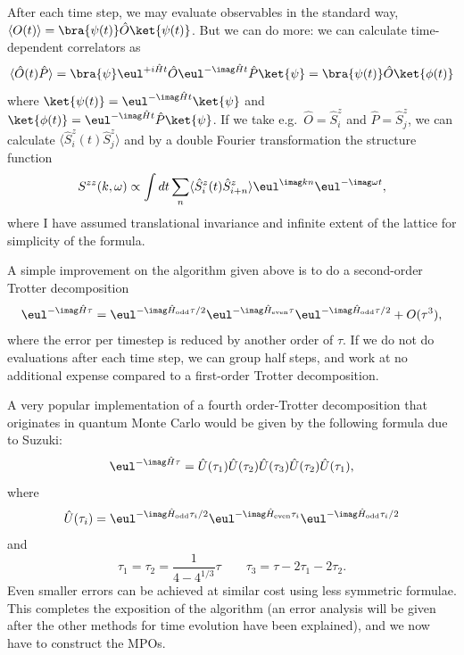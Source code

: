 After each time step, we may evaluate observables in the standard way, $\langle O(t) \rangle = \bra{\psi(t)} \hat{O} \ket{\psi(t)}$. But we can do more: we can calculate time-dependent correlators as
\begin{equation}
\langle \hat{O}(t) \hat{P} \rangle = \bra{\psi} \eul^{+i\hat{H}t} \hat{O} \eul^{-\imag \hat{H}t} \hat{P} \ket{\psi}
= \bra{\psi(t)} \hat{O} \ket{\phi(t)}
\end{equation}
where $\ket{\psi(t)} = \eul^{-\imag \hat{H}t}\ket{\psi}$ and $\ket{\phi(t)} = \eul^{-\imag \hat{H}t} \hat{P} \ket{\psi}$. If we take e.g.\ $\hat{O} = \hat{S}^z_i$ and $\hat{P} = \hat{S}^z_j$, we can calculate 
$\langle \hat{S}^z_i(t) \hat{S}^z_j \rangle$ and by a double Fourier transformation the structure function
\begin{equation}
S^{zz}(k,\omega) \propto \int dt \sum_{n} \langle \hat{S}^z_i(t) \hat{S}^z_{i+n} \rangle \eul^{\imag kn}\eul^{-\imag \omega t},
\end{equation}
where I have assumed translational invariance and infinite extent of the lattice for simplicity of the formula.

A simple improvement on the algorithm given above is to do a second-order Trotter decomposition 
\begin{equation}
\eul^{-\imag  \hat{H}\tau} = \eul^{-\imag  \hat{H}_{{\rm odd}} \tau/2}\eul^{-\imag  \hat{H}_{{\rm even}} \tau}\eul^{-\imag  \hat{H}_{{\rm odd}} \tau/2} + O(\tau^3),
\end{equation}
where the error per timestep is reduced by another order of  $\tau$. If we do not do evaluations after each time step, we can group half steps, and work at no additional expense compared to a first-order Trotter decomposition.

A very popular implementation of a fourth order-Trotter decomposition that originates in quantum Monte Carlo would be given by the following formula due to Suzuki\cite{Suzuki76,Suzuki91}:
\begin{equation}
\eul^{-\imag  \hat{H}\tau} = \hat{U}(\tau_1) \hat{U}(\tau_2) \hat{U}(\tau_3) \hat{U}(\tau_2) \hat{U}(\tau_1),  
\end{equation}
where 
\begin{equation}
\hat{U} (\tau_i) = \eul^{-\imag  \hat{H}_{{\rm odd}} \tau_i/2}\eul^{-\imag  \hat{H}_{{\rm even}} \tau_i}\eul^{-\imag  \hat{H}_{{\rm odd}}
\tau_i/2}
\end{equation}
and
\begin{equation}
\tau_1 = \tau_2 = \frac{1}{4-4^{1/3}} \tau  \quad\quad \tau_3 = \tau -2 \tau_1 - 2\tau_2 .
\end{equation}
Even smaller errors can be achieved at similar cost using less symmetric formulae\cite{McLachlan95}. This completes the exposition of the algorithm (an error analysis will be given after the other methods for time evolution have been explained), and we now have to construct the MPOs.

